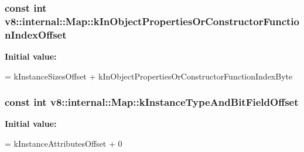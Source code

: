 \subsubsection[{\texorpdfstring{k\+In\+Object\+Properties\+Or\+Constructor\+Function\+Index\+Offset}{kInObjectPropertiesOrConstructorFunctionIndexOffset}}]{\setlength{\rightskip}{0pt plus 5cm}const int v8\+::internal\+::\+Map\+::k\+In\+Object\+Properties\+Or\+Constructor\+Function\+Index\+Offset\hspace{0.3cm}{\ttfamily [static]}}\hypertarget{classv8_1_1internal_1_1_map_abc6cd07ee758a0f593908f0d0f106201}{}\label{classv8_1_1internal_1_1_map_abc6cd07ee758a0f593908f0d0f106201}
{\bfseries Initial value\+:}
\begin{DoxyCode}
=
      kInstanceSizesOffset + kInObjectPropertiesOrConstructorFunctionIndexByte
\end{DoxyCode}
\subsubsection[{\texorpdfstring{k\+Instance\+Type\+And\+Bit\+Field\+Offset}{kInstanceTypeAndBitFieldOffset}}]{\setlength{\rightskip}{0pt plus 5cm}const int v8\+::internal\+::\+Map\+::k\+Instance\+Type\+And\+Bit\+Field\+Offset\hspace{0.3cm}{\ttfamily [static]}}\hypertarget{classv8_1_1internal_1_1_map_ac879a7d4d5e42e2191fc8a4ef08871ee}{}\label{classv8_1_1internal_1_1_map_ac879a7d4d5e42e2191fc8a4ef08871ee}
{\bfseries Initial value\+:}
\begin{DoxyCode}
=
      kInstanceAttributesOffset + 0
\end{DoxyCode}
